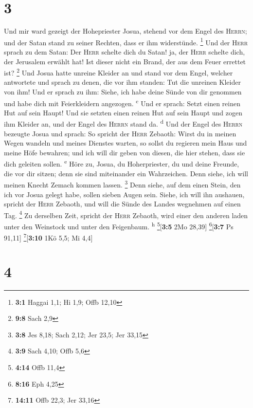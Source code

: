 \hypertarget{section-2}{%
\section{3}\label{section-2}}

 Und mir ward gezeigt der Hohepriester Josua, stehend vor
dem Engel des \textsc{Herrn}; und der Satan stand zu seiner Rechten,
dass er ihm widerstünde. \footnote{\textbf{3:1} Haggai 1,1; Hi 1,9; Offb
  12,10}  Und der \textsc{Herr} sprach zu dem Satan: Der
\textsc{Herr} schelte dich du Satan! ja, der \textsc{Herr} schelte dich,
der Jerusalem erwählt hat! Ist dieser nicht ein Brand, der aus dem Feuer
errettet ist? \footnote{\textbf{9:8} Sach 2,9}  Und Josua
hatte unreine Kleider an und stand vor dem Engel,  welcher
antwortete und sprach zu denen, die vor ihm standen: Tut die unreinen
Kleider von ihm! Und er sprach zu ihm: Siehe, ich habe deine Sünde von
dir genommen und habe dich mit Feierkleidern angezogen.
\textsuperscript{c}  Und er sprach: Setzt einen reinen Hut
auf sein Haupt! Und sie setzten einen reinen Hut auf sein Haupt und
zogen ihm Kleider an, und der Engel des \textsc{Herrn} stand da.
\textsuperscript{d}  Und der Engel des \textsc{Herrn}
bezeugte Josua und sprach:  So spricht der \textsc{Herr}
Zebaoth: Wirst du in meinen Wegen wandeln und meines Dienstes warten, so
sollst du regieren mein Haus und meine Höfe bewahren; und ich will dir
geben von diesen, die hier stehen, dass sie dich geleiten sollen.
\textsuperscript{e}  Höre zu, Josua, du Hoherpriester, du
und deine Freunde, die vor dir sitzen; denn sie sind miteinander ein
Wahrzeichen. Denn siehe, ich will meinen Knecht Zemach kommen lassen.
\footnote{\textbf{3:8} Jes 8,18; Sach 2,12; Jer 23,5; Jer 33,15}
 Denn siehe, auf dem einen Stein, den ich vor Josua gelegt
habe, sollen sieben Augen sein. Siehe, ich will ihn aushauen, spricht
der \textsc{Herr} Zebaoth, und will die Sünde des Landes wegnehmen auf
einen Tag. \footnote{\textbf{3:9} Sach 4,10; Offb 5,6} 
Zu derselben Zeit, spricht der \textsc{Herr} Zebaoth, wird einer den
anderen laden unter den Weinstock und unter den Feigenbaum.
\textsuperscript{h} \footnote{\textbf{4:14} Offb 11,4}{[}\textbf{3:5}
2Mo 28,39{]} \footnote{\textbf{8:16} Eph 4,25}{[}\textbf{3:7} Ps
91,11{]} \footnote{\textbf{14:11} Offb 22,3; Jer 33,16}{[}\textbf{3:10}
1Kö 5,5; Mi 4,4{]}

\hypertarget{section-3}{%
\section{4}\label{section-3}}

